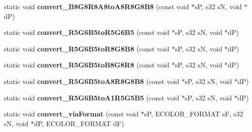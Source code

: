 \begin{DoxyCompactItemize}
\item 
\hypertarget{classirr_1_1video_1_1_c_color_converter_aba06eff9dbd3ac4a784f53159b5440db}{static void {\bfseries convert\-\_\-\-B8\-G8\-R8\-A8to\-A8\-R8\-G8\-B8} (const void $\ast$s\-P, s32 s\-N, void $\ast$d\-P)}\label{classirr_1_1video_1_1_c_color_converter_aba06eff9dbd3ac4a784f53159b5440db}

\item 
\hypertarget{classirr_1_1video_1_1_c_color_converter_a5d7a0d77eb66bacb94b0f5fc61c8a8a2}{static void {\bfseries convert\-\_\-\-R5\-G6\-B5to\-R5\-G6\-B5} (const void $\ast$s\-P, s32 s\-N, void $\ast$d\-P)}\label{classirr_1_1video_1_1_c_color_converter_a5d7a0d77eb66bacb94b0f5fc61c8a8a2}

\item 
\hypertarget{classirr_1_1video_1_1_c_color_converter_a9f77d09416dd5eda118fcfac6c76b281}{static void {\bfseries convert\-\_\-\-R5\-G6\-B5to\-R8\-G8\-B8} (const void $\ast$s\-P, s32 s\-N, void $\ast$d\-P)}\label{classirr_1_1video_1_1_c_color_converter_a9f77d09416dd5eda118fcfac6c76b281}

\item 
\hypertarget{classirr_1_1video_1_1_c_color_converter_aac83c77b496cb5f71eb286c200e69c08}{static void {\bfseries convert\-\_\-\-R5\-G6\-B5to\-B8\-G8\-R8} (const void $\ast$s\-P, s32 s\-N, void $\ast$d\-P)}\label{classirr_1_1video_1_1_c_color_converter_aac83c77b496cb5f71eb286c200e69c08}

\item 
\hypertarget{classirr_1_1video_1_1_c_color_converter_aa6b9d6bee375e78a35046d9a57cf8e58}{static void {\bfseries convert\-\_\-\-R5\-G6\-B5to\-A8\-R8\-G8\-B8} (const void $\ast$s\-P, s32 s\-N, void $\ast$d\-P)}\label{classirr_1_1video_1_1_c_color_converter_aa6b9d6bee375e78a35046d9a57cf8e58}

\item 
\hypertarget{classirr_1_1video_1_1_c_color_converter_af0c61ad8ea46facfcd33b1247fcd8bfe}{static void {\bfseries convert\-\_\-\-R5\-G6\-B5to\-A1\-R5\-G5\-B5} (const void $\ast$s\-P, s32 s\-N, void $\ast$d\-P)}\label{classirr_1_1video_1_1_c_color_converter_af0c61ad8ea46facfcd33b1247fcd8bfe}

\item 
\hypertarget{classirr_1_1video_1_1_c_color_converter_a413401a82f6d5b4dcdd703641778728e}{static void {\bfseries convert\-\_\-via\-Format} (const void $\ast$s\-P, E\-C\-O\-L\-O\-R\-\_\-\-F\-O\-R\-M\-A\-T s\-F, s32 s\-N, void $\ast$d\-P, E\-C\-O\-L\-O\-R\-\_\-\-F\-O\-R\-M\-A\-T d\-F)}\label{classirr_1_1video_1_1_c_color_converter_a413401a82f6d5b4dcdd703641778728e}

\end{DoxyCompactItemize}


